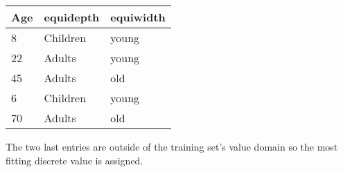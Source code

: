\begin{breakbox}
\begin{tabular}{l|l|l}
\textbf{Age} & \textbf{equidepth} & \textbf{equiwidth} \\
\hline
8   & Children  & young     \\
22  & Adults    & young     \\
45  & Adults    & old       \\
6   & Children  & young     \\
70  & Adults    & old      
\end{tabular}

The two last entries are outside of the training set's value domain so the most fitting discrete value is assigned.




\end{breakbox}


